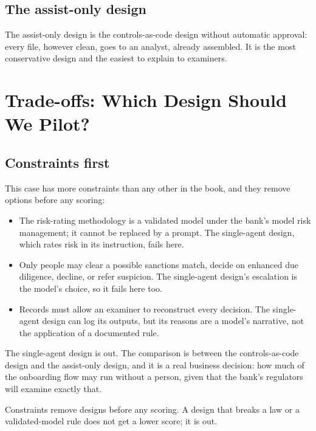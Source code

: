 \subsection{The assist-only design}

The assist-only design is the controls-as-code design without automatic approval: every file, however clean, goes to an analyst, already assembled. It is the most conservative design and the easiest to explain to examiners.

\section{Trade-offs: Which Design Should We Pilot?}
\label{sec:kyc-tradeoffs}

\subsection{Constraints first}

This case has more constraints than any other in the book, and they remove options before any scoring:
\begin{itemize}[itemsep=1pt]
  \item The risk-rating methodology is a validated model under the bank's model risk management; it cannot be replaced by a prompt. The single-agent design, which rates risk in its instruction, fails here.
  \item Only people may clear a possible sanctions match, decide on enhanced due diligence, decline, or refer suspicion. The single-agent design's escalation is the model's choice, so it fails here too.
  \item Records must allow an examiner to reconstruct every decision. The single-agent design can log its outputs, but its reasons are a model's narrative, not the application of a documented rule.
\end{itemize}

The single-agent design is out. The comparison is between the controls-as-code design and the assist-only design, and it is a real business decision: how much of the onboarding flow may run without a person, given that the bank's regulators will examine exactly that.

\begin{keyidea}
Constraints remove designs before any scoring. A design that breaks a law or a validated-model rule does not get a lower score; it is out.
\end{keyidea}

